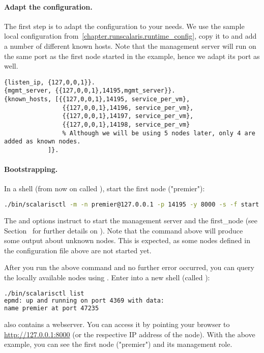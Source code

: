 \paragraph{Adapt the configuration.}
The first step is to adapt the configuration to your needs. We use the
sample local configuration from~\ref{chapter.runscalaris.runtime_config},
copy it to  and add a number of different known
hosts. Note that the management server will run on the same port as the
first node started in the example, hence we adapt its port as well.

\begin{lstlisting}
{listen_ip, {127,0,0,1}}.
{mgmt_server, {{127,0,0,1},14195,mgmt_server}}.
{known_hosts, [{{127,0,0,1},14195, service_per_vm},
                {{127,0,0,1},14196, service_per_vm},
                {{127,0,0,1},14197, service_per_vm},
                {{127,0,0,1},14198, service_per_vm}
                % Although we will be using 5 nodes later, only 4 are added as known nodes.
            ]}.
\end{lstlisting}

\paragraph{Bootstrapping.}
\label{par:Bootstrapping}

In a shell (from now on called ), start the first node ("premier"):
\begin{lstlisting}[language=sh]
./bin/scalarisctl -m -n premier@127.0.0.1 -p 14195 -y 8000 -s -f start
\end{lstlisting}
The  and  options instruct  to start the
management server and the first\_node
(see Section~ for further details on ).
Note that the command above will
produce some output about unknown nodes. This is expected, as some nodes
defined in the configuration file above are not started yet.

After you run the above command and no further error occurred, you can query
the locally available nodes using . Enter into a new shell
(called ):
\begin{lstlisting}[language=sh]
./bin/scalarisctl list
epmd: up and running on port 4369 with data:
name premier at port 47235
\end{lstlisting}

\scalaris{} also contains a webserver. You can access it by pointing your
browser to \url{http://127.0.0.1:8000} (or the respective IP address of the
node). With the above example, you can see the first node ("premier") and
its management role.

